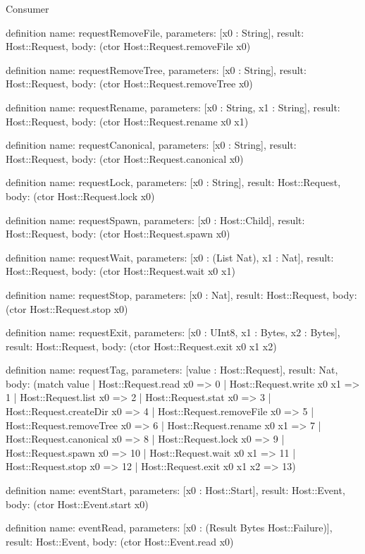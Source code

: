 \begin{lexlean}{Consumer}
\begin{semanticmodule}
definition{
  name: requestRemoveFile,
  parameters: [x0 : String],
  result: Host::Request,
  body: (ctor Host::Request.removeFile x0)
}

definition{
  name: requestRemoveTree,
  parameters: [x0 : String],
  result: Host::Request,
  body: (ctor Host::Request.removeTree x0)
}

definition{
  name: requestRename,
  parameters: [x0 : String, x1 : String],
  result: Host::Request,
  body: (ctor Host::Request.rename x0 x1)
}

definition{
  name: requestCanonical,
  parameters: [x0 : String],
  result: Host::Request,
  body: (ctor Host::Request.canonical x0)
}

definition{
  name: requestLock,
  parameters: [x0 : String],
  result: Host::Request,
  body: (ctor Host::Request.lock x0)
}

definition{
  name: requestSpawn,
  parameters: [x0 : Host::Child],
  result: Host::Request,
  body: (ctor Host::Request.spawn x0)
}

definition{
  name: requestWait,
  parameters: [x0 : (List Nat), x1 : Nat],
  result: Host::Request,
  body: (ctor Host::Request.wait x0 x1)
}

definition{
  name: requestStop,
  parameters: [x0 : Nat],
  result: Host::Request,
  body: (ctor Host::Request.stop x0)
}

definition{
  name: requestExit,
  parameters: [x0 : UInt8, x1 : Bytes, x2 : Bytes],
  result: Host::Request,
  body: (ctor Host::Request.exit x0 x1 x2)
}

definition{
  name: requestTag,
  parameters: [value : Host::Request],
  result: Nat,
  body: (match value
    | Host::Request.read x0 => 0
    | Host::Request.write x0 x1 => 1
    | Host::Request.list x0 => 2
    | Host::Request.stat x0 => 3
    | Host::Request.createDir x0 => 4
    | Host::Request.removeFile x0 => 5
    | Host::Request.removeTree x0 => 6
    | Host::Request.rename x0 x1 => 7
    | Host::Request.canonical x0 => 8
    | Host::Request.lock x0 => 9
    | Host::Request.spawn x0 => 10
    | Host::Request.wait x0 x1 => 11
    | Host::Request.stop x0 => 12
    | Host::Request.exit x0 x1 x2 => 13)
}

definition{
  name: eventStart,
  parameters: [x0 : Host::Start],
  result: Host::Event,
  body: (ctor Host::Event.start x0)
}

definition{
  name: eventRead,
  parameters: [x0 : (Result Bytes Host::Failure)],
  result: Host::Event,
  body: (ctor Host::Event.read x0)
}


\end{semanticmodule}
\end{lexlean}
